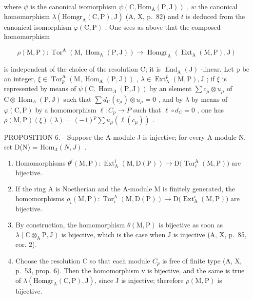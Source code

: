 where \(\psi\) is the canonical isomorphism \(\psi(\mathrm{C},\mathrm{Hom}_{\mathrm{A}}(\mathrm{P},\mathrm{J}))\) , \(w\) the canonical homomorphism \(\lambda(\mathrm{Homgr}_{\mathrm{A}}(\mathrm{C},\mathrm{P}),\mathrm{J})\) (A, X, p.~82) and \(t\) is deduced from the canonical isomorphism \(\varphi(\mathrm{C},\mathrm{P})\) . One sees as above that the composed homomorphism

\[
\rho (\mathrm{M}, \mathrm{P}): \operatorname{Tor} ^ {\mathrm{A}} (\mathrm{M}, \operatorname{Hom} _ {\mathrm{A}} (\mathrm{P}, \mathrm{J})) \longrightarrow \operatorname{Homgr} _ {\mathrm{A}} \left(\operatorname{Ext} _ {\mathrm{A}} (\mathrm{M}, \mathrm{P}), \mathrm{J}\right)
\]

is independent of the choice of the resolution C; it is \(\operatorname{End}_{\mathrm{A}}(\mathrm{J})\) -linear. Let p be an integer, \(\xi \in \operatorname{Tor}_{p}^{\mathrm{A}}(\mathrm{M}, \operatorname{Hom}_{\mathrm{A}}(\mathrm{P}, \mathrm{J}))\) , \(\lambda \in \operatorname{Ext}_{\mathrm{A}}^{p}(\mathrm{M}, \mathrm{P}), \mathrm{J}\) ; if \(\xi\) is represented by means of \(\psi(\mathrm{C}, \operatorname{Hom}_{\Lambda}(\mathrm{P}, \mathrm{J}))\) by an element \(\sum c_{\mu} \otimes u_{\mu}\) of \(\mathrm{C} \otimes \operatorname{Hom}_{\Lambda}(\mathrm{P}, \mathrm{J})\) such that \(\sum d_{\mathrm{C}}(c_{\mu}) \otimes u_{\mu} = 0\) , and by \(\lambda\) by means of \(\varphi(\mathrm{C}, \mathrm{P})\) by a homomorphism \(\ell : C_{p} \to P\) such that \(\ell \circ d_{C} = 0\) , one has \(\rho(\mathrm{M}, \mathrm{P})(\xi)(\lambda) = (-1)^{p} \sum u_{\mu} (\ell(c_{\mu}))\) .

PROPOSITION 6. - Suppose the A-module J is injective; for every A-module N, set D(N) = \(\mathrm{Hom}_{\Lambda}(N,J)\) .

\begin{enumerate}
\def\labelenumi{\alph{enumi})}
\item
  Homomorphisms \(\theta^{i}(\mathrm{M},\mathrm{P}):\operatorname{Ext}_{\mathrm{A}}^{i}(\mathrm{M},\mathrm{D}(\mathrm{P}))\longrightarrow \mathrm{D}\big(\operatorname {Tor}_{i}^{\mathrm{A}}(\mathrm{M},\mathrm{P})\big)\) are bijective.
\item
  If the ring A is Noetherian and the A-module M is finitely generated, the homomorphisms \(\rho_{i}(\mathrm{M},\mathrm{P}):\operatorname{Tor}_{i}^{\mathrm{A}}(\mathrm{M},\mathrm{D}(\mathrm{P}))\longrightarrow \mathrm{D}\bigl (\operatorname {Ext}_{\mathrm{A}}^{i}(\mathrm{M},\mathrm{P})\bigr)\) are bijective.
\item
  By construction, the homomorphism \(\theta(\mathrm{M},\mathrm{P})\) is bijective as soon as \(\lambda(\mathrm{C}\otimes_{\mathrm{A}}\mathrm{P},\mathrm{J})\) is bijective, which is the case when J is injective (A, X, p.~85, cor. 2).
\item
  Choose the resolution C so that each module \(C_{p}\) is free of finite type (A, X, p.~53, prop. 6). Then the homomorphism v is bijective, and the same is true of \(\lambda(\text{Homgr}_{\text{A}}(\text{C}, \text{P}), \text{J})\), since J is injective; therefore \(\rho(\text{M}, \text{P})\) is bijective.
\end{enumerate}

